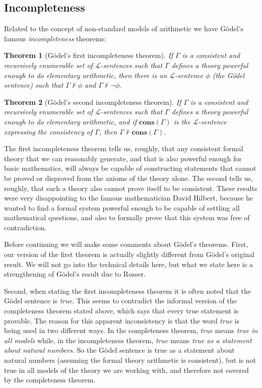 \documentclass{article}
\theoremstyle{plain}
\newtheorem{theorem}{Theorem}[section]{\bfseries}{\itshape}
\theoremstyle{definition}
\begin{document}
\subsection{Incompleteness}

Related to the concept of non-standard models of arithmetic we have G\"odel's famous \emph{incompleteness} theorems:
\begin{theorem}[G\"odel's first incompleteness theorem]
If $\Gamma$ is a consistent and recursively enumerable set of $\mathscr{L}$-sentences such that $\Gamma$ defines a theory powerful enough to do elementary arithmetic, then there is an $\mathscr{L}$-sentence $\phi$ (the G\"odel sentence) such that $\Gamma\not\vdash \phi$ and $\Gamma\not\vdash \neg\phi$.
\end{theorem}

\begin{theorem}[G\"odel's second incompleteness theorem]
If $\Gamma$ is a consistent and recursively enumerable set of $\mathscr{L}$-sentences such that $\Gamma$ defines a theory powerful enough to do elementary arithmetic, and if $\mathbf{cons}(\Gamma)$ is the $\mathscr{L}$-sentence expressing the consistency of $\Gamma$, then $\Gamma\not\vdash \mathbf{cons}(\Gamma)$.
\end{theorem}
The first incompleteness theorem tells us, roughly, that any consistent formal theory that we can reasonably generate, and that is also powerful enough for basic mathematics, will always be capable of constructing statements that cannot be proved or disproved from the axioms of the theory alone. The second tells us, roughly, that such a theory also cannot prove itself to be consistent. These results were very disappointing to the famous mathematician David Hilbert, because he wanted to find a formal system powerful enough to be capable of settling all mathematical questions, and also to formally prove that this system was free of contradiction. 

Before continuing we will make some comments about G\"odel's theorems. First, our version of the first theorem is actually slightly different from G\"odel's original result. We will not go into the technical details here, but what we state here is a strengthening of G\"odel's result due to Rosser. 

Second, when stating the first incompleteness theorem it is often noted that the G\"odel sentence is \emph{true}. This seems to contradict the informal version of the completeness theorem stated above, which says that every true statement is provable. The reason for this apparent inconsistency is that the word \emph{true} is being used in two different ways. In the completeness theorem, \emph{true} means \emph{true in all models} while, in the incompleteness theorem, \emph{true} means \emph{true as a statement about natural numbers}. So the G\"odel sentence is true as a statement about natural numbers (assuming the formal theory arithmetic is consistent), but is not true in all models of the theory we are working with, and therefore not covered by the completeness theorem. 
\end{document}

